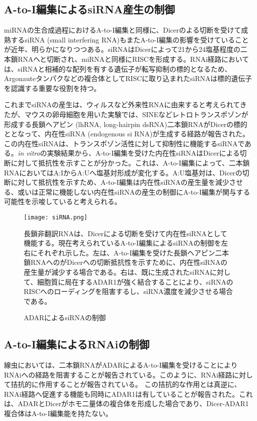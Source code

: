 \subsection{A-to-I編集によるsiRNA産生の制御}
miRNAの生合成過程におけるA-to-I編集と同様に、Dicerのよる切断を受けて成熟するsiRNA (small interfering RNA)もまたA-to-I編集の影響を受けていることが近年、明らかになりつつある。siRNAはDicerによって21から24塩基程度の二本鎖RNAへと切断され、miRNAと同様にRISCを形成する。RNAi経路においては、siRNAと相補的な配列を有する遺伝子が転写抑制の標的となるため、Argonauteタンパクなどの複合体としてRISCに取り込まれたsiRNAは標的遺伝子を認識する重要な役割を持つ。
\par
これまでsiRNAの産生は、ウィルスなど外来性RNAに由来すると考えられてきたが、マウスの卵母細胞を用いた実験では、SINEなどレトロトランスポゾンが形成する長鎖ヘアピン (lhRNA, long-hairpin dsRNA)二本鎖RNAがDicerの標的ととなって、内在性siRNA (endogenous si RNA)が生成する経路が報告された。この内在性siRNAは、トランスポゾン活性に対して抑制性に機能するsiRNAである。\textit{in vitro}の実験結果から、A-to-I編集を受けた内在性siRNAはDicerによる切断に対して抵抗性を示すことが分かった。これは、A-to-I編集によって、二本鎖RNAにおいてはA:IからA:Uへ塩基対形成が変化する。A:U塩基対は、Dicerの切断に対して抵抗性を示すため、A-to-I編集は内在性siRNAの産生量を減少させる、或いは正常に機能しない内在性siRNAの産生の制御にA-to-I編集が関与する可能性を示唆していると考えられる。

\begin{figure}[!htbp]
	\begin{center}
		\texttt{[image: siRNA.png]}
	\end{center}
	\caption{ADARによるsiRNAの制御}
	\begin{flushleft}
		\small{長鎖非翻訳RNAは、Dicerによる切断を受けて内在性siRNAとして機能する。現在考えられているA-to-I編集によるsiRNAの制御を左右にそれぞれ示した。左は、A-to-I編集を受けた長鎖ヘアピン二本鎖RNAへのがDicerへの切断抵抗性を示すために、内在性siRNAの産生量が減少する場合である。右は、既に生成されたsiRNAに対して、細胞質に局在するADAR1が強く結合することにより、siRNAのRISCへのローディングを阻害するし、siRNA濃度を減少させる場合である。}
	\end{flushleft}
	\label{fig:adar_siRNA}
\end{figure}

\subsection{A-to-I編集によるRNAiの制御}
線虫においては、二本鎖RNAがADARによるA-to-I編集を受けることによりRNAiへの経路を阻害することが報告されている。このように、RNAi経路に対して拮抗的に作用することが報告されている。
この拮抗的な作用とは真逆に、RNAi経路へ促進する機能も同時にADAR1は有していることが報告された。これは、ADARとDicerがホモ二量体の複合体を形成した場合であり、Dicer-ADAR1複合体はA-to-I編集能を持たない。

